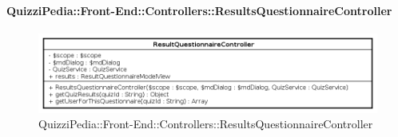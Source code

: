 \paragraph[QuizziPedia::Front-End::Controllers\\::ResultsQuestionnaireController]{QuizziPedia::Front-End::Controllers::ResultsQuestionnaireController}
\begin{figure} [ht]
	\centering
	\includegraphics[scale=0.6]{UML/Classi/Front-End/QuizziPedia_Front-end_Controller_ResultsQuestionnaireController.png}
	\caption{QuizziPedia::Front-End::Controllers::ResultsQuestionnaireController}
\end{figure} \FloatBarrier
